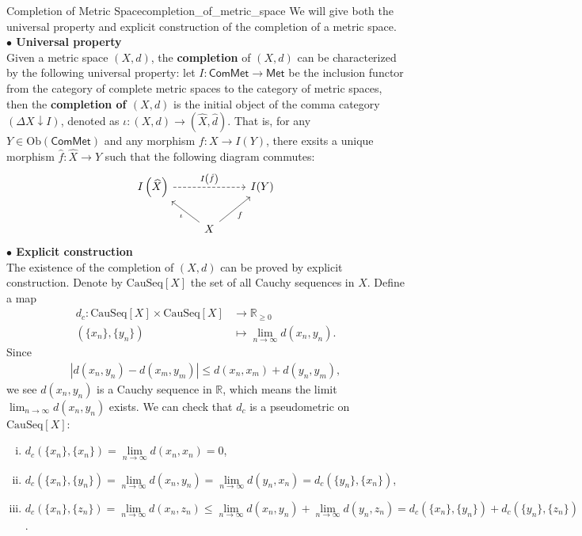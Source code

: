 \documentclass{report}
\begin{document}
\begin{definition}{Completion of Metric Space}{completion_of_metric_space}
	We will give both the universal property and explicit construction of the completion of a metric space.\\
	\textbf{$\bullet$ Universal property}\\
	Given a metric space $(X,d)$, the \textbf{completion} of $(X,d)$ can be characterized by the following universal property: let $I: \mathsf{ComMet}\to\mathsf{Met}$ be the inclusion functor from the category of complete metric spaces to the category of metric spaces, then the \textbf{completion of $(X,d)$} is the initial object of the comma category $\left(\Delta X\downarrow I\right)$, denoted as $\iota:(X,d)\to\left(\widehat{X},\hat{d}\right)$. That is, for any $Y\in\mathrm{Ob}(\mathsf{ComMet})$ and any morphism $f:X\to I(Y)$, there exsits a unique morphism $\hat{f}:\widehat{X}\to Y$ such that the following diagram commutes:
	\[
		\begin{tikzcd}
			I\left(\widehat{X}\right) \arrow[rr, "I\left(\hat{f}\right)", dashed] &                                        & I(Y) \\
			& X \arrow[lu, "\iota"] \arrow[ru, "f"'] &
		\end{tikzcd}
	\]
	\textbf{$\bullet$ Explicit construction}\\
	The existence of the completion of $(X,d)$ can be proved by explicit construction. Denote by $\mathrm{CauSeq}[X]$ the set of all Cauchy sequences in $X$. Define a map
	\begin{align*}
		d_c:\mathrm{CauSeq}[X]\times\mathrm{CauSeq}[X] & \longrightarrow\mathbb{R}_{\ge 0}       \\
		\left(\{x_n\},\{y_n\}\right)                   & \longmapsto\lim_{n\to\infty}d(x_n,y_n).
	\end{align*}
	Since
	\begin{align*}
		|d(x_n,y_n)-d(x_m,y_m)|\le d(x_n,x_m)+d(y_n,y_m),
	\end{align*}
	we see $d(x_n,y_n)$ is a Cauchy sequence in $\mathbb{R}$, which means the limit $\lim_{n\to\infty}d(x_n,y_n)$ exists. We can check that $d_c$ is a pseudometric on $\mathrm{CauSeq}[X]$:
	\begin{enumerate}[(i)]
		\item $d_c(\{x_n\},\{x_n\})=\lim\limits_{n\to\infty}d(x_n,x_n)=0$,
		\item $d_c(\{x_n\},\{y_n\})=\lim\limits_{n\to\infty}d(x_n,y_n)=\lim\limits_{n\to\infty}d(y_n,x_n)=d_c(\{y_n\},\{x_n\})$,
		\item $d_c(\{x_n\},\{z_n\})=\lim\limits_{n\to\infty}d(x_n,z_n)\le\lim\limits_{n\to\infty}d(x_n,y_n)+\lim\limits_{n\to\infty}d(y_n,z_n)=d_c(\{x_n\},\{y_n\})+d_c(\{y_n\},\{z_n\})$.

\end{enumerate}
\end{definition}
\end{document}
